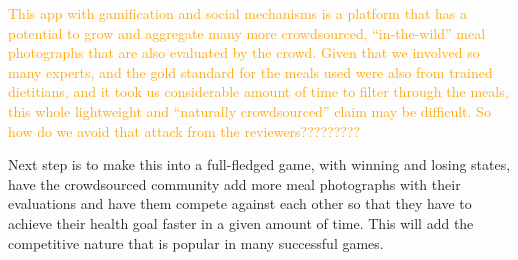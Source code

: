 
\textcolor{orange}{This app with gamification and social mechanisms is a platform that has a potential to grow and aggregate many more crowdsourced, ``in-the-wild'' meal photographs that are also evaluated by the crowd. Given that we involved so many experts, and the gold standard for the meals used were also from trained dietitians, and it took us considerable amount of time to filter through the meals, this whole lightweight and ``naturally crowdsourced'' claim may be difficult. So how do we avoid that attack from the reviewers?????????}

Next step is to make this into a full-fledged game, with winning and losing states, have the crowdsourced community add more meal photographs with their evaluations and have them compete against each other so that they have to achieve their health goal faster in a given amount of time. This will add the competitive nature that is popular in many successful games. 

